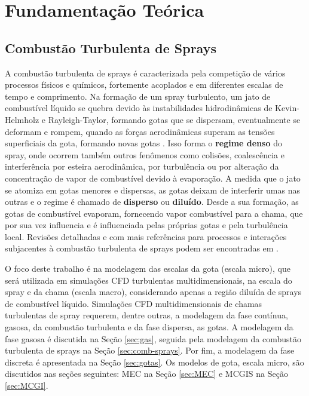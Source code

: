 \section{Fundamentação Teórica}


\subsection{Combustão Turbulenta de Sprays} \label{sec:teoria}

A combustão turbulenta de sprays é caracterizada pela competição de vários processos físicos e químicos, fortemente acoplados e em diferentes escalas de tempo e comprimento. 
Na formação de um spray turbulento, um jato de combustível líquido se quebra devido às instabilidades hidrodinâmicas de Kevin-Helmholz e Rayleigh-Taylor, formando gotas que se dispersam, eventualmente se deformam e rompem, quando as forças aerodinâmicas superam as tensões superficiais da gota, formando novas gotas \cite{JennyB2012}.
Isso forma o \textbf{regime denso} do spray, onde ocorrem também outros fenômenos como colisões, coalescência e interferência por esteira aerodinâmica, por turbulência ou por alteração da concentração de vapor de combustível devido à evaporação.
A medida que o jato se atomiza em gotas menores e dispersas, as gotas deixam de interferir umas nas outras e o regime é chamado de \textbf{disperso} ou \textbf{diluído}. 
Desde a sua formação, as gotas de combustível evaporam, fornecendo vapor combustível para a chama, que por sua vez influencia e é influenciada pelas próprias gotas e pela turbulência local.
Revisões detalhadas e com mais referências para processos e interações subjacentes à combustão turbulenta de sprays podem ser encontradas em \cite{JennyB2012, MasriA2016, SanchezA2015, ZhouL2021,JiangX2010}.

O foco deste trabalho é na modelagem das escalas da gota (escala micro), que será utilizada em simulações CFD turbulentas multidimensionais, na escala do spray e da chama (escala macro), considerando apenas a região diluída de sprays de combustível líquido.
Simulações CFD multidimensionais de chamas turbulentas de spray requerem, dentre outras, a modelagem da fase contínua, gasosa, da combustão turbulenta e da fase dispersa, as gotas.
A modelagem da fase gasosa é discutida na Seção \ref{sec:gas}, seguida pela modelagem da combustão turbulenta de sprays na Seção \ref{sec:comb-sprays}. 
Por fim, a modelagem da fase discreta é apresentada na Seção \ref{sec:gotas}.
Os modelos de gota, escala micro, são discutidos nas seções seguintes: MEC na Seção	\ref{sec:MEC} e MCGIS na Seção \ref{sec:MCGI}.


